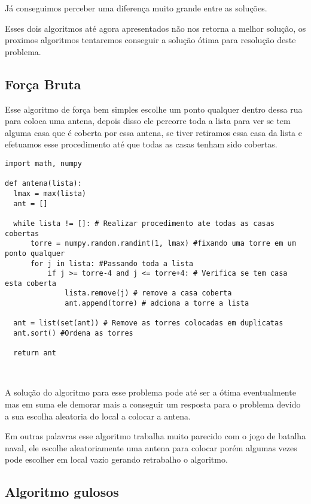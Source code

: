 \documentclass[11pt]{article}
\begin{document}
Já conseguimos perceber uma diferença muito grande entre as soluções.

Esses dois algoritmos até agora apresentados não nos retorna a melhor solução, os proximos algoritmos tentaremos conseguir a
solução ótima para resolução deste problema.

\subsection{Força Bruta}

\label{sec-3-2}

Esse algoritmo de força bem simples escolhe um ponto qualquer dentro dessa rua para coloca uma antena, depois disso ele percorre 
toda a lista para ver se tem alguma casa que é coberta por essa antena, se tiver retiramos essa casa da lista e efetuamos esse 
procedimento até que todas as casas tenham sido cobertas.

\begin{verbatim}
import math, numpy

def antena(lista):
  lmax = max(lista)
  ant = []
  
  while lista != []: # Realizar procedimento ate todas as casas cobertas
      torre = numpy.random.randint(1, lmax) #fixando uma torre em um ponto qualquer
      for j in lista: #Passando toda a lista
          if j >= torre-4 and j <= torre+4: # Verifica se tem casa esta coberta
              lista.remove(j) # remove a casa coberta
              ant.append(torre) # adciona a torre a lista
  
  ant = list(set(ant)) # Remove as torres colocadas em duplicatas
  ant.sort() #Ordena as torres

  return ant
 
 
\end{verbatim}

A solução do algoritmo para esse problema pode até ser a ótima eventualmente mas em suma ele demorar mais a conseguir um resposta
para o problema devido a sua escolha aleatoria do local a colocar a antena. 

Em outras palavras esse algoritmo trabalha muito parecido com o jogo de batalha naval, ele escolhe aleatoriamente uma antena para
colocar porém algumas vezes pode escolher em local vazio gerando retrabalho o algoritmo.

\subsection{Algoritmo gulosos}
\end{document}
